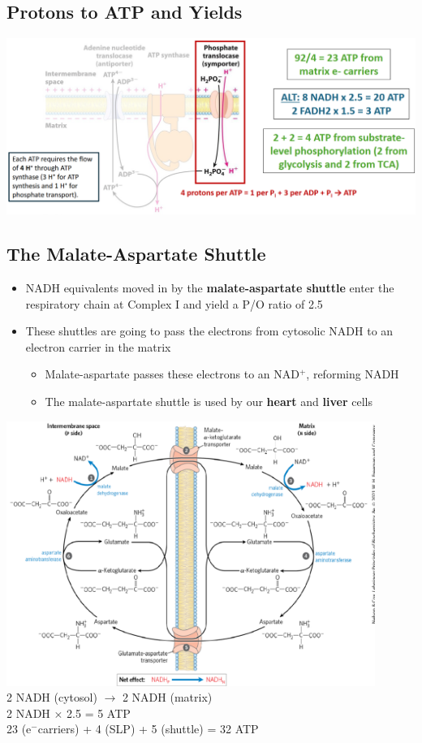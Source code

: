 \documentclass[10pt]{article}
\newcommand{\pc}{$^+$}
\newcommand{\nc}{$^-$}
\begin{document}
\subsection*{Protons to ATP and Yields}
\begin{center} 
    \includegraphics*[width=\textwidth]{L3_14.png}
\end{center}

\subsection*{The Malate-Aspartate Shuttle}
\begin{itemize}
	\item NADH equivalents moved in by the \textbf{malate-aspartate shuttle} enter the respiratory chain at Complex I and yield a P/O ratio of 2.5
	\item These shuttles are going to pass the electrons from cytosolic NADH to an electron carrier in the matrix
	\begin{itemize}
        \item Malate-aspartate passes these electrons to an NAD\pc, reforming NADH
        \item The malate-aspartate shuttle is used by our \textbf{heart} and \textbf{liver} cells
    \end{itemize}
\end{itemize}
\begin{center} 
	\includegraphics*[width=0.9\textwidth]{L3_15.png}\\
    2 NADH (cytosol) $\rightarrow$ 2 NADH (matrix)\\
    2 NADH $\times$ 2.5 = 5 ATP\\
    23 (e\nc carriers) + 4 (SLP) + 5 (shuttle) = 32 ATP
\end{center}
\end{document}
